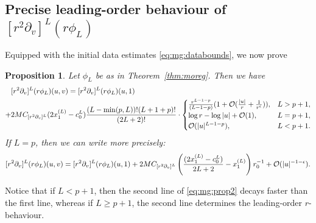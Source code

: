 \documentclass[11pt,english]{article}
\numberwithin{equation}{section}
\theoremstyle{remark}
\theoremstyle{plain}
\newtheorem{prop}{Proposition}[section]
\newenvironment{nalign}{
    \begin{equation}
    \begin{aligned}
}{
    \end{aligned}
    \end{equation}
    \ignorespacesafterend
}
\theoremstyle{remark}
\newcommand{\pv}{\partial_v}
\renewcommand{\(}{\left(}
\renewcommand{\)}{\right)}
\begin{document}
\subsection{Precise leading-order behaviour of \texorpdfstring{$[r^2\pv]^L(r\phi_L)$}{(r2 d/dv)L(r phi-L)}}\label{sec:mg:x}Equipped with the initial data estimates \eqref{eq:mg:databounds}, we now prove
\begin{prop}\label{prop:prop.10.2}
Let $\phi_L$ be as in Theorem~\ref{thm:moreg}. Then we have
\begin{nalign}\label{eq:mg:prop2}
&[r^2\pv]^L(r\phi_L)(u,v)=[r^2\pv]^L(r\phi_L)(u,1)\\
+&2M\cv{L}(2x_1^{(L)}-c_0^L)\frac{(L-\min(p,L))!(L+1+p)!}{(2L+2)!}\cdot \begin{cases} \frac{r^{L-1-p}}{(L-1-p)} (1+\mathcal O(\frac{|u|}{r}+\frac{1}{r^\epsilon})),&L>p+1,\\
\log r-\log |u| +\mathcal O(1),& L=p+1,\\
\mathcal O(|u|^{L-1-p}) ,&L<p+1.\end{cases}
\end{nalign}
If $L=p$, then we can write more precisely:
\begin{nalign}
[r^2\pv]^L(r\phi_L)(u,v)=[r^2\pv]^L(r\phi_L)(u,1)+
2M\cv{L}\left(\frac{(2x_1^{(L)}-c_0^L)}{2L+2}-x_1^{(L)}\right)r_0^{-1}+\mathcal{O}(|u|^{-1-\epsilon}).
\end{nalign}
\end{prop}
Notice that if $L<p+1$, then the second line of \eqref{eq:mg:prop2} decays faster than the first line, whereas if $L\geq p+1$, the second line determines the leading-order $r$-behaviour. 
\end{document}
